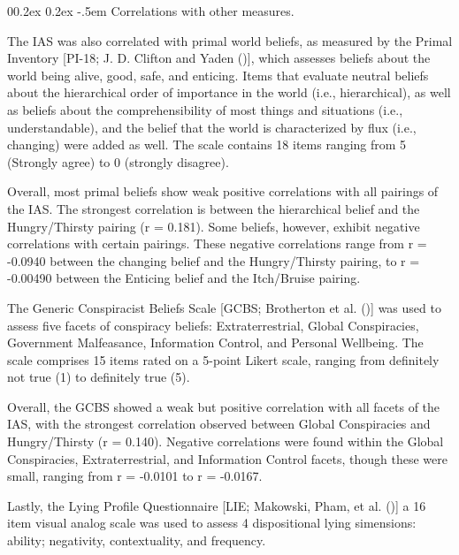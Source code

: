 \documentclass[
  man,
  floatsintext,
  longtable,
  nolmodern,
  notxfonts,
  notimes,
  colorlinks=true,linkcolor=blue,citecolor=blue,urlcolor=blue]{apa7}
\makeatletter
\renewcommand{\paragraph}{\@startsection{paragraph}{4}{\parindent}%
	{0\baselineskip \@plus 0.2ex \@minus 0.2ex}%
	{-.5em}%
	{\normalfont\normalsize\bfseries\typesectitle}}
\makeatother
\begin{document}
\paragraph{Correlations with other
measures.}\label{correlations-with-other-measures}

The IAS was also correlated with primal world beliefs, as measured by
the Primal Inventory {[}PI-18; J. D. Clifton and Yaden
(){]}, which assesses beliefs about
the world being alive, good, safe, and enticing. Items that evaluate
neutral beliefs about the hierarchical order of importance in the world
(i.e., hierarchical), as well as beliefs about the comprehensibility of
most things and situations (i.e., understandable), and the belief that
the world is characterized by flux (i.e., changing) were added as well.
The scale contains 18 items ranging from 5 (Strongly agree) to 0
(strongly disagree).

Overall, most primal beliefs show weak positive correlations with all
pairings of the IAS. The strongest correlation is between the
hierarchical belief and the Hungry/Thirsty pairing (r = 0.181). Some
beliefs, however, exhibit negative correlations with certain pairings.
These negative correlations range from r = -0.0940 between the changing
belief and the Hungry/Thirsty pairing, to r = -0.00490 between the
Enticing belief and the Itch/Bruise pairing.

The Generic Conspiracist Beliefs Scale {[}GCBS; Brotherton et al.
(){]} was used to assess
five facets of conspiracy beliefs: Extraterrestrial, Global
Conspiracies, Government Malfeasance, Information Control, and Personal
Wellbeing. The scale comprises 15 items rated on a 5-point Likert scale,
ranging from definitely not true (1) to definitely true (5).

Overall, the GCBS showed a weak but positive correlation with all facets
of the IAS, with the strongest correlation observed between Global
Conspiracies and Hungry/Thirsty (r = 0.140). Negative correlations were
found within the Global Conspiracies, Extraterrestrial, and Information
Control facets, though these were small, ranging from r = -0.0101 to r =
-0.0167.

Lastly, the Lying Profile Questionnaire {[}LIE; Makowski, Pham, et al.
(){]} a 16 item visual analog
scale was used to assess 4 dispositional lying simensions: ability;
negativity, contextuality, and frequency.
\end{document}

